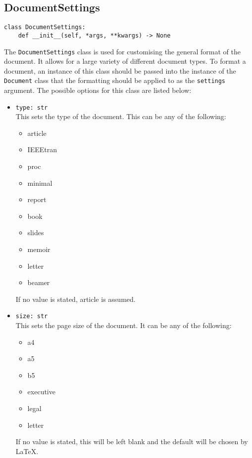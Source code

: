 \documentclass{article}
\begin{document}
\subsection{DocumentSettings}\label{subsec:documentsettings}
\begin{verbatim}
class DocumentSettings:
	def __init__(self, *args, **kwargs) -> None
\end{verbatim}
The \verb|DocumentSettings| class is used for customising the general format of the document. It allows for a large variety of different document types. To format a document, an instance of this class should be passed into the instance of the \verb|Document| class that the formatting should be applied to as the \verb|settings| argument. The possible options for this class are listed below:\begin{itemize}
\item \verb|type: str|\\
This sets the type of the document. This can be any of the following:\begin{multicols}{2}\begin{itemize}
\item article
\item IEEEtran
\item proc
\item minimal
\item report
\item book
\item slides
\item memoir
\item letter
\item beamer
\end{itemize}
\end{multicols}If no value is stated, article is assumed.
\item \verb|size: str|\\
This sets the page size of the document. It can be any of the following:\begin{multicols}{2}\begin{itemize}
\item a4
\item a5
\item b5
\item executive
\item legal
\item letter
\end{itemize}
\end{multicols}If no value is stated, this will be left blank and the default will be chosen by \LaTeX.

\end{itemize}
\end{document}
